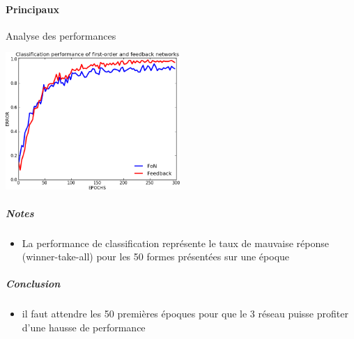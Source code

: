     \paragraph{Principaux}
      Analyse des performances
      \begin{center}
	\includegraphics[width=250px]{data/expF1/perff.png}
      \end{center}
      \subparagraph{Notes}
	\begin{itemize}
	  \item La performance de classification représente le taux de mauvaise réponse (winner-take-all) pour les 50 formes présentées sur une époque
	\end{itemize}
      \subparagraph{Conclusion}
	\begin{itemize}
	  \item il faut attendre les 50 premières époques pour que le 3 réseau puisse profiter d'une hausse de performance
	\end{itemize}
